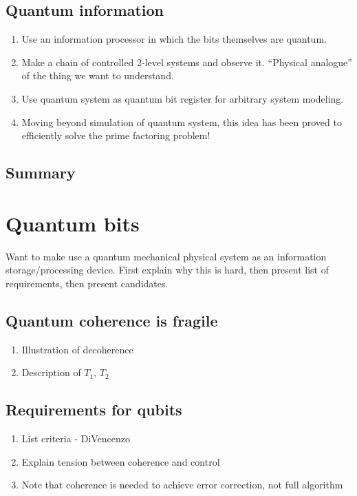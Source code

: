 \documentclass{report}
\begin{document}
\subsection{Quantum information}
\begin{enumerate}
\item Use an information processor in which the bits themselves are quantum.
\item Make a chain of controlled 2-level systems and observe it. ``Physical analogue'' of the thing we want to understand.
\item Use quantum system as quantum bit register for arbitrary system modeling.
\item Moving beyond simulation of quantum system, this idea has been proved to efficiently solve the prime factoring problem!
\end{enumerate}
\subsection{Summary}

\section{Quantum bits}
Want to make use a quantum mechanical physical system as an information storage/processing device. First explain why this is hard, then present list of requirements, then present candidates.

\subsection{Quantum coherence is fragile}
\begin{enumerate}
\item Illustration of decoherence
\item Description of $T_1$, $T_2$
\end{enumerate}

\subsection{Requirements for qubits}
\begin{enumerate}
\item List criteria - DiVencenzo
\item Explain tension between coherence and control
\item Note that coherence is needed to achieve error correction, not full algorithm
\end{enumerate}
\end{document}

